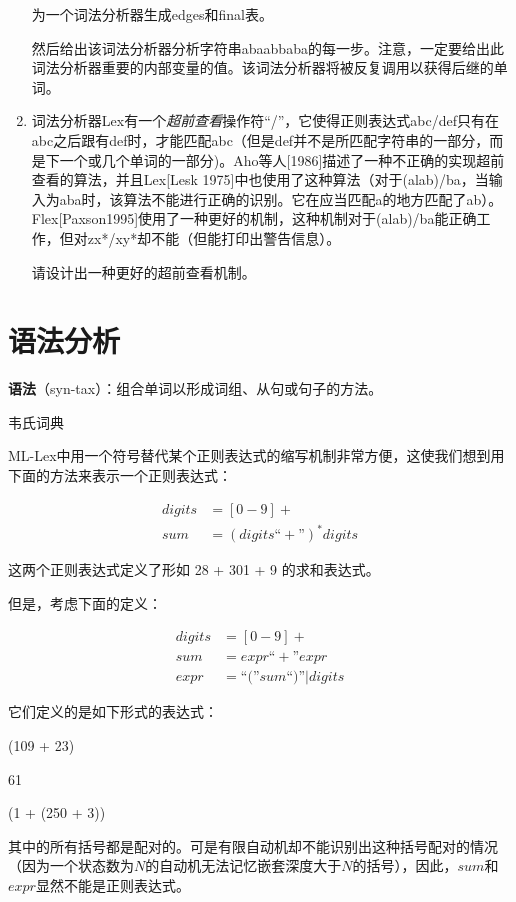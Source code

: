 \documentclass[cn,11pt,chinese]{elegantbook}
\begin{document}
\begin{enumerate}
  为一个词法分析器生成edges和final表。
  
  然后给出该词法分析器分析字符串abaabbaba的每一步。注意，一定要给出此词法分析器重要的内部变量的值。该词法分析器将被反复调用以获得后继的单词。
  
  \item 词法分析器Lex有一个\textit{超前查看}操作符“/”，它使得正则表达式abc/def只有在abc之后跟有def时，才能匹配abc（但是def并不是所匹配字符串的一部分，而是下一个或几个单词的一部分)。Aho等人[1986]描述了一种不正确的实现超前查看的算法，并且Lex[Lesk 1975]中也使用了这种算法（对于(alab)/ba，当输入为aba时，该算法不能进行正确的识别。它在应当匹配a的地方匹配了ab）。Flex[Paxson1995]使用了一种更好的机制，这种机制对于(alab)/ba能正确工作，但对zx*/xy*却不能（但能打印出警告信息）。

  请设计出一种更好的超前查看机制。
\end{enumerate}

\chapter{语法分析}

\epigraph{\textbf{语法}（syn-tax）：组合单词以形成词组、从句或句子的方法。}{韦氏词典}

ML-Lex中用一个符号替代某个正则表达式的缩写机制非常方便，这使我们想到用下面的方法来表示一个正则表达式：

\begin{align*}
digits &= [0-9]+ \\
sum &= (digits\text{``}+\text{''})^*digits
\end{align*}

这两个正则表达式定义了形如 28 + 301 + 9 的求和表达式。

但是，考虑下面的定义：

\begin{align*}
digits &= [0-9]+ \\
sum &= expr\text{``}+\text{''}expr \\
expr &= \text{``(''}sum\text{``)''}|digits
\end{align*}

它们定义的是如下形式的表达式：

(109 + 23)

61

(1 + (250 + 3))

其中的所有括号都是配对的。可是有限自动机却不能识别出这种括号配对的情况（因为一个状态数为$N$的自动机无法记忆嵌套深度大于$N$的括号），因此，$sum$和$expr$显然不能是正则表达式。
\end{document}
